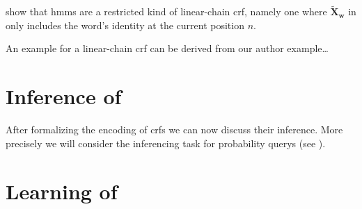 \citet{sutton2010introduction} show that \glspl{hmm} are a restricted kind of \gls{linear-chain crf}, namely one where $\bm{\tilde{X}_w}$ in  only includes the word's identity at the current position $n$.

An example for a  \gls{linear-chain crf} can be derived from our author example\dots{}

\section{Inference of }\label{sec:inference-crfs}

After formalizing the encoding of \glspl{crf} we can now discuss their inference.
More precisely we will consider the inferencing task for \glspl{probability query} (see ).




\section{Learning of }\label{sec:learning-crfs}


